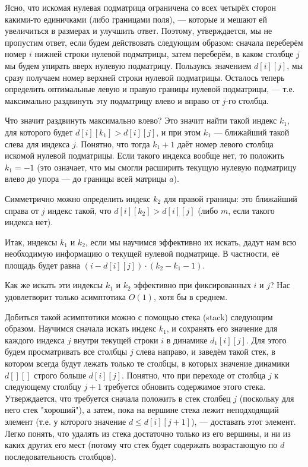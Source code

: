 Ясно, что искомая нулевая подматрица ограничена со всех четырёх сторон какими-то единичками (либо границами поля), --- которые и мешают ей увеличиться в размерах и улучшить ответ. Поэтому, утверждается, мы не пропустим ответ, если будем действовать следующим образом: сначала переберём номер $i$ нижней строки нулевой подматрицы, затем переберём, в каком столбце $j$ мы будем упирать вверх нулевую подматрицу. Пользуясь значением $d[i][j]$, мы сразу получаем номер верхней строки нулевой подматрицы. Осталось теперь определить оптимальные левую и правую границы нулевой подматрицы, --- т.е. максимально раздвинуть эту подматрицу влево и вправо от $j$-го столбца.

Что значит раздвинуть максимально влево? Это значит найти такой индекс $k_1$, для которого будет $d[i][k_1] > d[i][j]$, и при этом $k_1$ --- ближайший такой слева для индекса $j$. Понятно, что тогда $k_1+1$ даёт номер левого столбца искомой нулевой подматрицы. Если такого индекса вообще нет, то положить $k_1=-1$ (это означает, что мы смогли расширить текущую нулевую подматрицу влево до упора --- до границы всей матрицы $a$).

Симметрично можно определить индекс $k_2$ для правой границы: это ближайший справа от $j$ индекс такой, что $d[i][k_2] > d[i][j]$ (либо $m$, если такого индекса нет).

Итак, индексы $k_1$ и $k_2$, если мы научимся эффективно их искать, дадут нам всю необходимую информацию о текущей нулевой подматрице. В частности, её площадь будет равна $(i - d[i][j]) \cdot (k_2 - k_1 - 1)$.

Как же искать эти индексы $k_1$ и $k_2$ эффективно при фиксированных $i$ и $j$? Нас удовлетворит только асимптотика $O(1)$, хотя бы в среднем.

Добиться такой асимптотики можно с помощью стека (stack) следующим образом. Научимся сначала искать индекс $k_1$, и сохранять его значение для каждого индекса $j$ внутри текущей строки $i$ в динамике $d_1[i][j]$. Для этого будем просматривать все столбцы $j$ слева направо, и заведём такой стек, в котором всегда будут лежать только те столбцы, в которых значение динамики $d[][]$ строго больше $d[i][j]$. Понятно, что при переходе от столбца $j$ к следующему столбцу $j+1$ требуется обновить содержимое этого стека. Утверждается, что требуется сначала положить в стек столбец $j$ (поскольку для него стек "хороший"), а затем, пока на вершине стека лежит неподходящий элемент (т.е. у которого значение $d \le d[i][j+1]$), --- доставать этот элемент. Легко понять, что удалять из стека достаточно только из его вершины, и ни из каких других его мест (потому что стек будет содержать возрастающую по $d$ последовательность столбцов).

